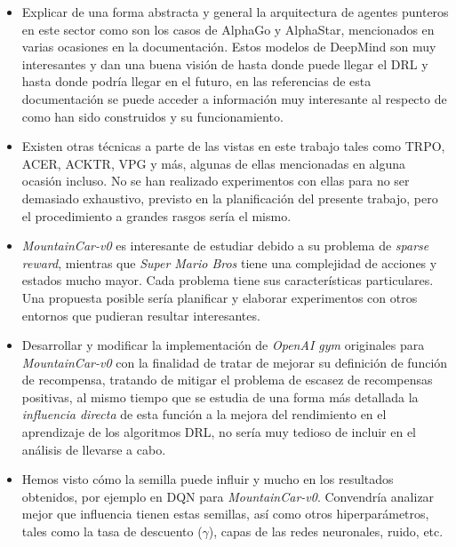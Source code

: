 \documentclass[11pt,fleqn]{book} %
\begin{document}
\begin{itemize}
	\item Explicar de una forma abstracta y general la arquitectura de agentes punteros en este sector como son los casos de AlphaGo y AlphaStar, mencionados en varias ocasiones en la documentación. Estos modelos de DeepMind son muy interesantes y dan una buena visión de hasta donde puede llegar el DRL y hasta donde podría llegar en el futuro, en las referencias de esta documentación se puede acceder a información muy interesante al respecto de como han sido construidos y su funcionamiento. \\
	
	\item Existen otras técnicas a parte de las vistas en este trabajo tales como TRPO, ACER, ACKTR, VPG y más, algunas de ellas mencionadas en alguna ocasión incluso. No se han realizado experimentos con ellas para no ser demasiado exhaustivo, previsto en la planificación del presente trabajo, pero el procedimiento a grandes rasgos sería el mismo. \\
	
	\item \textit{MountainCar-v0} es interesante de estudiar debido a su problema de \textit{sparse reward}, mientras que \textit{Super Mario Bros} tiene una complejidad de acciones y estados mucho mayor. Cada problema tiene sus características particulares. Una propuesta posible sería planificar y elaborar experimentos con otros entornos que pudieran resultar interesantes. \\
	
	\item Desarrollar y modificar la implementación de \textit{OpenAI gym} originales para \textit{MountainCar-v0} con la finalidad de tratar de mejorar su definición de función de recompensa, tratando de mitigar el problema de escasez de recompensas positivas, al mismo tiempo que se estudia de una forma más detallada la \textit{influencia directa} de esta función a la mejora del rendimiento en el aprendizaje de los algoritmos DRL, no sería muy tedioso de incluir en el análisis de llevarse a cabo. \\
	
	\item Hemos visto cómo la semilla puede influir y mucho en los resultados obtenidos, por ejemplo en DQN para \textit{MountainCar-v0}. Convendría analizar mejor que influencia tienen estas semillas, así como otros hiperparámetros, tales como la tasa de descuento ($\gamma$), capas de las redes neuronales, ruido, etc.
	
\end{itemize}
\end{document}
